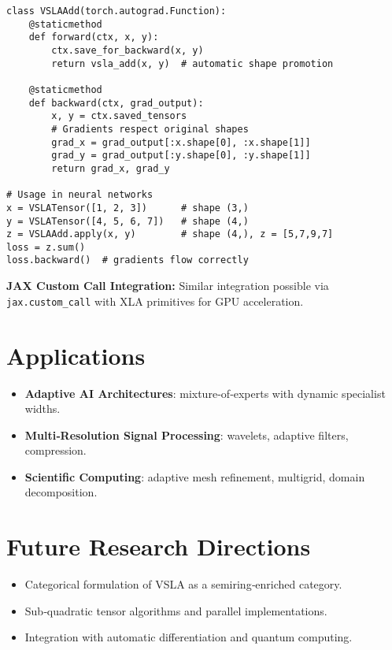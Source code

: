 \documentclass[11pt]{article}
\begin{document}
\begin{tcolorbox}[colback=api,colframe=green!50!black,title=PyTorch Integration Example]
\begin{verbatim}
class VSLAAdd(torch.autograd.Function):
    @staticmethod
    def forward(ctx, x, y):
        ctx.save_for_backward(x, y)
        return vsla_add(x, y)  # automatic shape promotion
    
    @staticmethod  
    def backward(ctx, grad_output):
        x, y = ctx.saved_tensors
        # Gradients respect original shapes
        grad_x = grad_output[:x.shape[0], :x.shape[1]]  
        grad_y = grad_output[:y.shape[0], :y.shape[1]]
        return grad_x, grad_y

# Usage in neural networks
x = VSLATensor([1, 2, 3])      # shape (3,)
y = VSLATensor([4, 5, 6, 7])   # shape (4,) 
z = VSLAAdd.apply(x, y)        # shape (4,), z = [5,7,9,7]
loss = z.sum()
loss.backward()  # gradients flow correctly
\end{verbatim}
\end{tcolorbox}

\textbf{JAX Custom Call Integration:} Similar integration possible via \texttt{jax.custom\_call} with XLA primitives for GPU acceleration.

\section{Applications}
\begin{samepage}
\begin{itemize}[leftmargin=1.5em]
  \item \textbf{Adaptive AI Architectures}: mixture‑of‑experts with dynamic specialist widths.
  \item \textbf{Multi‑Resolution Signal Processing}: wavelets, adaptive filters, compression.
  \item \textbf{Scientific Computing}: adaptive mesh refinement, multigrid, domain decomposition.
\end{itemize}
\end{samepage}

\section{Future Research Directions}
\begin{itemize}[leftmargin=1.5em]
  \item Categorical formulation of VSLA as a semiring‑enriched category.
  \item Sub‑quadratic tensor algorithms and parallel implementations.
  \item Integration with automatic differentiation and quantum computing.
\end{itemize}
\end{document}
